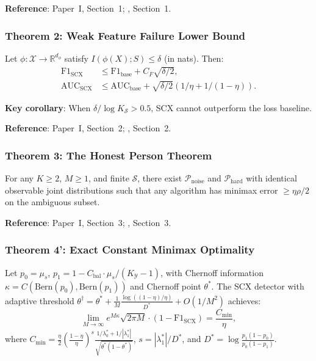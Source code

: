 \documentclass{article}
\begin{document}
\textbf{Reference}: Paper~I, Section~1; \cite{theorems_unified}, Section~1.

\subsubsection*{Theorem 2: Weak Feature Failure Lower Bound}
Let $\phi: \mathcal{X} \to \mathbb{R}^{d_\phi}$ satisfy $I(\phi(X); S) \leq \delta$ (in nats). Then:
\begin{align}
\text{F1}_{\text{SCX}} &\leq \text{F1}_{\text{base}} + C_F\sqrt{\delta/2}, \\
\text{AUC}_{\text{SCX}} &\leq \text{AUC}_{\text{base}} + \sqrt{\delta/2}(1/\eta + 1/(1-\eta)).
\end{align}

\textbf{Key corollary}: When $\delta / \log K_{\mathcal{S}} > 0.5$, SCX cannot outperform the loss baseline.

\textbf{Reference}: Paper~I, Section~2; \cite{theorems_unified}, Section~2.

\subsubsection*{Theorem 3: The Honest Person Theorem}
For any $K \geq 2$, $M \geq 1$, and finite $\mathcal{S}$, there exist $\mathcal{P}_{\text{noise}}$ and $\mathcal{P}_{\text{hard}}$ with identical observable joint distributions such that any algorithm has minimax error $\geq \eta\rho/2$ on the ambiguous subset.

\textbf{Reference}: Paper~I, Section~3; \cite{theorems_unified}, Section~3.

\subsubsection*{Theorem 4': Exact Constant Minimax Optimality}
Let $p_0 = \mu_s$, $p_1 = 1 - C_{\text{bal}}\cdot\mu_s/(K_{\mathcal{Y}}-1)$, with Chernoff information $\kappa = C(\text{Bern}(p_0), \text{Bern}(p_1))$ and Chernoff point $\theta^*$. The SCX detector with adaptive threshold $\theta^\dagger = \theta^* + \frac{1}{M}\frac{\log((1-\eta)/\eta)}{D^*} + O(1/M^2)$ achieves:
\begin{equation}
\lim_{M\to\infty} e^{M\kappa}\sqrt{2\pi M}\cdot(1-\text{F1}_{\text{SCX}}) = \frac{C_{\min}}{\eta},
\end{equation}
where $C_{\min} = \frac{\eta}{2}(\frac{1-\eta}{\eta})^s \frac{1/\lambda_0^* + 1/|\lambda_1^*|}{\sqrt{\theta^*(1-\theta^*)}}$, $s = |\lambda_1^*|/D^*$, and $D^* = \log\frac{p_1(1-p_0)}{p_0(1-p_1)}$.
\end{document}
